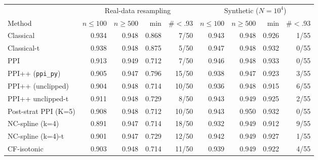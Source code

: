\begin{tabular}{lrrrrrrrr}
\toprule
 & \multicolumn{4}{c}{Real-data resampling} & \multicolumn{4}{c}{Synthetic ($N{=}10^4$)} \\
Method & $n{\le}100$ & $n{\ge}500$ & min & \#$<$.93 & $n{\le}100$ & $n{\ge}500$ & min & \#$<$.93 \\
\midrule
Classical & 0.934 & 0.948 & 0.868 & 7/50 & 0.943 & 0.948 & 0.926 & 1/55 \\
Classical-t & 0.938 & 0.948 & 0.875 & 5/50 & 0.947 & 0.948 & 0.932 & 0/55 \\
PPI & 0.913 & 0.949 & 0.712 & 7/50 & 0.946 & 0.948 & 0.933 & 0/55 \\
PPI++ (\texttt{ppi\_py}) & 0.905 & 0.947 & 0.796 & 15/50 & 0.938 & 0.947 & 0.923 & 3/55 \\
PPI++ (unclipped) & 0.904 & 0.948 & 0.714 & 10/50 & 0.936 & 0.948 & 0.915 & 6/55 \\
PPI++ unclipped-t & 0.911 & 0.948 & 0.729 & 8/50 & 0.943 & 0.949 & 0.925 & 2/55 \\
Post-strat PPI (K=5) & 0.908 & 0.948 & 0.712 & 10/50 & 0.943 & 0.950 & 0.932 & 0/55 \\
NC-spline (k=4) & 0.891 & 0.947 & 0.714 & 18/50 & 0.932 & 0.949 & 0.912 & 9/55 \\
NC-spline (k=4)-t & 0.901 & 0.947 & 0.729 & 12/50 & 0.942 & 0.949 & 0.927 & 1/55 \\
CF-isotonic & 0.903 & 0.948 & 0.714 & 11/50 & 0.939 & 0.949 & 0.922 & 4/55 \\
\bottomrule
\end{tabular}